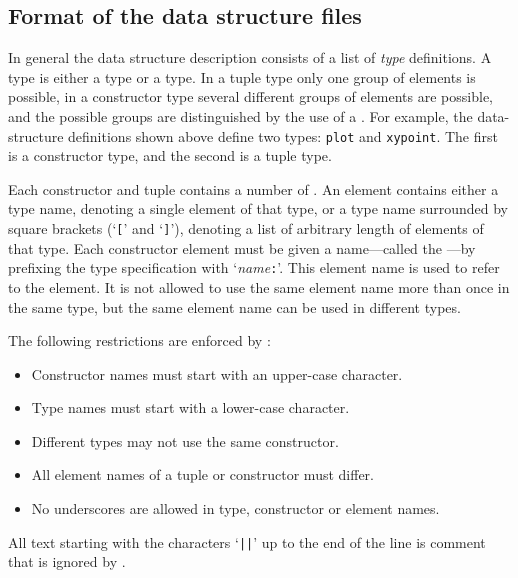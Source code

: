 \subsection{Format of the data structure files}
In general the data structure description consists of a list of
{\em type} definitions.
A type is either a  type or a  type.
In a tuple type only one group of elements is possible,
in a constructor type several different groups of elements are
possible,
and the possible groups are distinguished by the use of a .
For example, the data-structure definitions shown above define two types: 
\verb+plot+ and \verb+xypoint+. The first is a constructor type,
and the second is a tuple type.
\par
Each constructor and tuple contains a number of .
An element contains either a type name,
denoting a single element of that type,
or a type name surrounded by square brackets (`{\tt [}' and `{\tt ]}'),
denoting a list of arbitrary length of elements of that type.
Each constructor element must be given a name---called the
---by prefixing the type
specification with `{\it name\/}{\tt :}'.
This element name is used to refer to the element.
It is not allowed to use the same element name more than once in the same type,
but the same element name can be used in different types.
\par
The following restrictions are enforced by {\Tm}:
\begin{itemize}
\item
Constructor names must start with an upper-case character.
\item
Type names must start with a lower-case character.
\item
Different types may not use the same constructor.
\item
All element names of a tuple or constructor must differ.
\item
No underscores are allowed in type, constructor or element names.
\end{itemize}
\par
All text starting with the characters `{\tt ||}' up to the end of the line
is comment that is ignored by {\Tm}.
